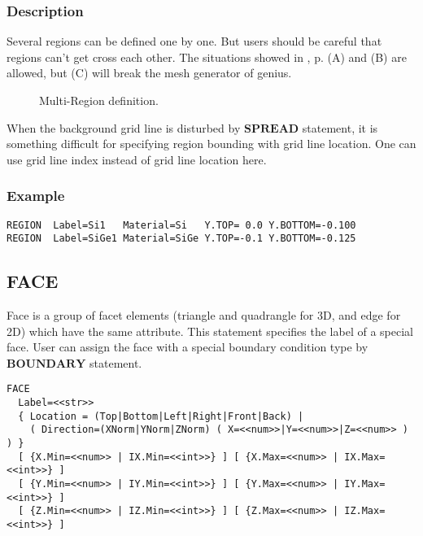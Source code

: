 \documentclass[oneside,12pt]{cgd_book}
\begin{document}
\par
\subsubsection{Description}
Several regions can be defined one by one. But users should be careful that regions can't get cross each
          other. The situations showed in ,
p. \pageref{fig:CmdRef:Region:MultiRegion}(A) and (B) are allowed, but
          (C) will break the mesh generator of genius.
\par
\begin{figure}[H]
\caption{\label{fig:CmdRef:Region:MultiRegion}Multi-Region definition.}
\end{figure}

When the background grid line is disturbed by $\mathbf{SPREAD}$ statement, it is something
          difficult for specifying region bounding with grid line location. One can use grid line index instead of grid
          line location here.
\par
\subsubsection{Example}
\begin{lstlisting}[style=GeniusCode]
REGION  Label=Si1   Material=Si   Y.TOP= 0.0 Y.BOTTOM=-0.100
REGION  Label=SiGe1 Material=SiGe Y.TOP=-0.1 Y.BOTTOM=-0.125
\end{lstlisting}
\subsection{FACE}
Face is a group of facet elements (triangle and quadrangle for 3D, and edge for 2D) which have the
        same attribute. This statement specifies the label of a special face. User can assign the face with a special
        boundary condition type by $\mathbf{BOUNDARY}$ statement.
\par
\begin{lstlisting}[style=GeniusCmd]
FACE
  Label=<<str>>
  { Location = (Top|Bottom|Left|Right|Front|Back) |
    ( Direction=(XNorm|YNorm|ZNorm) ( X=<<num>>|Y=<<num>>|Z=<<num>> ) ) }
  [ {X.Min=<<num>> | IX.Min=<<int>>} ] [ {X.Max=<<num>> | IX.Max=<<int>>} ]
  [ {Y.Min=<<num>> | IY.Min=<<int>>} ] [ {Y.Max=<<num>> | IY.Max=<<int>>} ]
  [ {Z.Min=<<num>> | IZ.Min=<<int>>} ] [ {Z.Max=<<num>> | IZ.Max=<<int>>} ]
\end{lstlisting}
\end{document}
